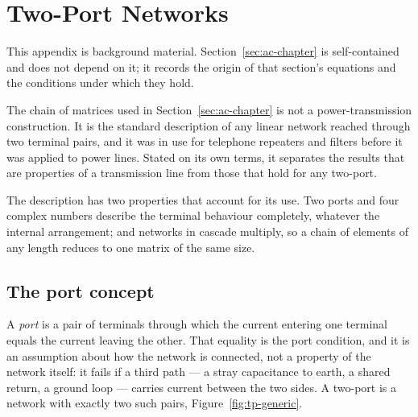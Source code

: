 \section{Two-Port Networks}
\label{sec:two-port}

This appendix is background material. Section~\ref{sec:ac-chapter} is
self-contained and does not depend on it; it records the origin of that
section's equations and the conditions under which they hold.

The chain of matrices used in Section~\ref{sec:ac-chapter} is not a
power-transmission construction. It is the standard description of any
linear network reached through two terminal pairs, and it was in use for
telephone repeaters and filters before it was applied to power lines. Stated
on its own terms, it separates the results that are properties of a
transmission line from those that hold for any two-port.

The description has two properties that account for its use. Two ports and
four complex numbers describe the terminal behaviour completely, whatever
the internal arrangement; and networks in cascade multiply, so a chain of
elements of any length reduces to one matrix of the same size.

\subsection{The port concept}
\label{sec:tp-ports}

A \emph{port} is a pair of terminals through which the current entering one
terminal equals the current leaving the other. That equality is the port
condition, and it is an assumption about how the network is connected, not a
property of the network itself: it fails if a third path --- a stray
capacitance to earth, a shared return, a ground loop --- carries current
between the two sides. A two-port is a network with exactly two such pairs,
Figure~\ref{fig:tp-generic}.

